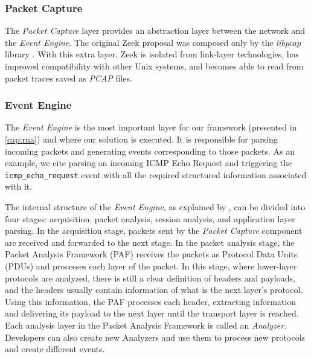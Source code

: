 \subsubsection*{Packet Capture}

The \textit{Packet Capture} layer provides an abstraction layer between the network and the \textit{Event Engine}. The original Zeek proposal \cite{Paxson1999} was composed only by the \textit{libpcap} library \cite{Libpcap}. With this extra layer, Zeek is isolated from link-layer technologies, has improved compatibility with other Unix systems, and becomes able to read from packet traces saved as \textit{PCAP} files.

\subsubsection*{Event Engine}
\label{sec:bg:zeek_ee}

The \textit{Event Engine} is the most important layer for our framework (presented in \autoref{cap:rna}) and where our solution is executed. It is responsible for parsing incoming packets and generating events corresponding to those packets. As an example, we cite parsing an incoming ICMP Echo Request and triggering the \texttt{icmp\_echo\_request} event with all the required structured information associated with it.

The internal structure of the \textit{Event Engine}, as explained by , can be divided into four stages: acquisition, packet analysis, session analysis, and application layer parsing. In the acquisition stage, packets sent by the \textit{Packet Capture} component are received and forwarded to the next stage. In the packet analysis stage, the Packet Analysis Framework (PAF) receives the packets as Protocol Data Units (PDUs) and processes each layer of the packet. In this stage, where lower-layer protocols are analyzed, there is still a clear definition of headers and payloads, and the headers usually contain information of what is the next layer's protocol. Using this information, the PAF processes each header, extracting information and delivering its payload to the next layer until the transport layer is reached. Each analysis layer in the Packet Analysis Framework is called an \textit{Analyzer}. Developers can also create new Analyzers and use them to process new protocols and create different events.


